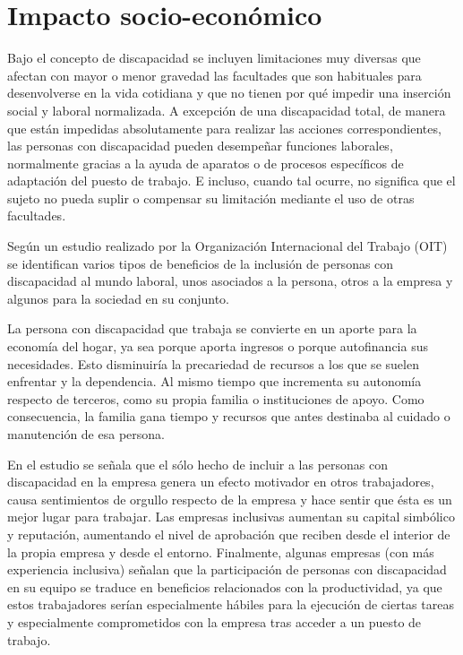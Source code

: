 \section{Impacto socio-económico}
Bajo el concepto de discapacidad se incluyen limitaciones muy diversas que afectan con mayor o menor gravedad las facultades que son habituales para desenvolverse en la vida cotidiana y que no tienen por qué impedir una inserción social y laboral normalizada. A excepción de una discapacidad total, de manera que están impedidas absolutamente para realizar las acciones correspondientes, las personas con discapacidad pueden desempeñar funciones laborales, normalmente gracias a la ayuda de aparatos o de procesos específicos de adaptación del puesto de trabajo. E incluso, cuando tal ocurre, no significa que el sujeto no pueda suplir o compensar su limitación mediante el uso de otras facultades. 

Según un estudio realizado por la Organización Internacional del Trabajo (OIT) se identifican varios tipos de beneficios de la inclusión de personas con discapacidad al mundo laboral, unos asociados a la persona, otros a la empresa y algunos para la sociedad en su conjunto.

La persona con discapacidad que trabaja se convierte en un aporte para la economía del hogar, ya sea porque aporta ingresos o porque autofinancia sus necesidades. Esto disminuiría la precariedad de recursos a los que se suelen enfrentar y la dependencia. Al mismo tiempo que incrementa su autonomía respecto de terceros, como su propia familia o instituciones de apoyo. Como consecuencia, la familia gana tiempo y recursos que antes destinaba al cuidado o manutención de esa persona. 

En el estudio se señala que el sólo hecho de incluir a las personas con discapacidad en la empresa genera un efecto motivador en otros trabajadores, causa sentimientos de orgullo respecto de la empresa y hace sentir que ésta es un mejor lugar para trabajar. Las empresas inclusivas aumentan su capital simbólico y reputación, aumentando el nivel de aprobación que reciben desde el interior de la propia empresa y desde el entorno. Finalmente, algunas empresas (con más experiencia inclusiva) señalan que la participación de personas con discapacidad en su equipo se traduce en beneficios relacionados con la productividad, ya que estos trabajadores serían especialmente hábiles para la ejecución de ciertas tareas y especialmente comprometidos con la empresa tras acceder a un puesto de trabajo. 

